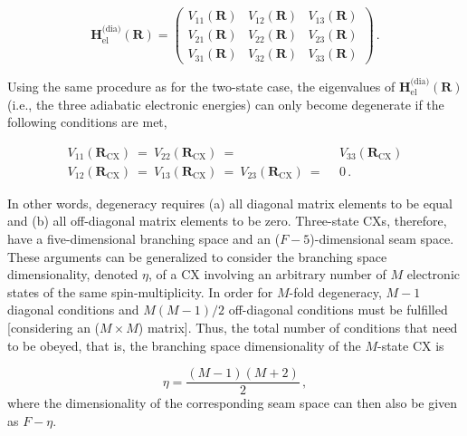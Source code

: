 \documentclass[9pt,bestpractices,pubversion]{livecoms}
\newcommand{\R}{\mathbf{R}}
\begin{document}
\begin{equation}
\label{dia_elec_ham_3_state}
     \mathbf{H}_{\text{el}}^{\text{(dia)}}(\R) =
    \begin{pmatrix}
        V_{11}(\R) & V_{12}(\R) & V_{13}(\R)\\
        V_{21}(\R) & V_{22}(\R) & V_{23}(\R)\\
        V_{31}(\R) & V_{32}(\R) & V_{33}(\R)
    \end{pmatrix} \, .
\end{equation}

Using the same procedure as for the two-state case, the eigenvalues of $\mathbf{H}_{\text{el}}^{\text{(dia)}}(\R)$ (i.e., the three adiabatic electronic energies) can only become degenerate if the following conditions are met,

\begin{equation}
\label{degen_cond_3_state}
\begin{split}
    V_{11}(\R_{\text{CX}}) \: = \: V_{22}(\R_{\text{CX}}) \: =& \:\: V_{33}(\R_{\text{CX}})\\
    V_{12}(\R_{\text{CX}}) \: = \: V_{13}(\R_{\text{CX}}) \: = \: V_{23}(\R_{\text{CX}}) \: =& \:\: 0 \, .
\end{split}
\end{equation}

In other words, degeneracy requires (a) all diagonal matrix elements to be equal and (b) all off-diagonal matrix elements to be zero.
Three-state CXs, therefore, have a five-dimensional branching space and an ($F - 5$)-dimensional seam space.
These arguments can be generalized to consider the branching space dimensionality, denoted $\eta$, of a CX involving an arbitrary number of $M$ electronic states of the same spin-multiplicity.
In order for $M$-fold degeneracy, $M - 1$ diagonal conditions and $M(M - 1)/2$ off-diagonal conditions must be fulfilled [considering an ($M \times M$) matrix].\cite{lipkowitz_conical_2007}
Thus, the total number of conditions that need to be obeyed, that is, the branching space dimensionality of the $M$-state CX is

\begin{equation}
\label{num_degen_conds}
    \eta = \frac{\left( M - 1 \right)\left( M + 2 \right)}{2} \, ,
\end{equation}
where the dimensionality of the corresponding seam space can then also be given as $F - \eta$.
\end{document}
